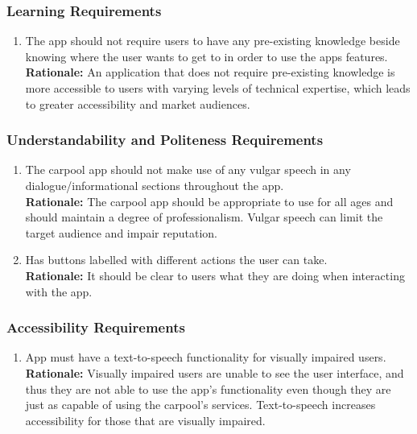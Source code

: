 \documentclass[]{article}
\begin{document}
\subsubsection{Learning Requirements}
\label{ssub:learning_requirements}
\begin{enumerate}[{UH-L}1. ]
	\item The app should not require users to have any pre-existing knowledge beside knowing where the user wants to get to in order to use the apps features.\\
	{\bf Rationale:} An application that does not require pre-existing knowledge is more accessible to users with varying levels of technical expertise, which leads to greater accessibility and market audiences.
\end{enumerate}

\subsubsection{Understandability and Politeness Requirements}
\label{ssub:understandability_and_politeness_requirements}
\begin{enumerate}[{UH-UP}1. ]
	\item The carpool app should not make use of any vulgar speech in any dialogue/informational sections throughout the app.\\
	{\bf Rationale:} The carpool app should be appropriate to use for all ages and should maintain a degree of professionalism. Vulgar speech can limit the target audience and impair reputation.
	\item Has buttons labelled with different actions the user can take.\\
	{\bf Rationale:} It should be clear to users what they are doing when interacting with the app.
\end{enumerate}

\subsubsection{Accessibility Requirements}
\label{ssub:accessibility_requirements}
\begin{enumerate}[{UH-A}1. ]
	\item App must have a text-to-speech functionality for visually impaired users.\\
	{\bf Rationale:} Visually impaired users are unable to see the user interface, and thus they are not able to use the app's functionality even though they are just as capable of using the carpool's services. Text-to-speech increases accessibility for those that are visually impaired.
\end{enumerate}
\end{document}
